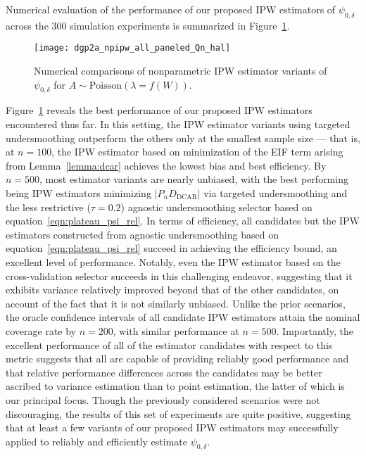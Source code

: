 Numerical evaluation of the performance of our proposed IPW estimators of
$\psi_{0,\delta}$ across the $300$ simulation experiments is summarized in
Figure~\ref{fig:dgp2a_npipw}.
\begin{figure}[H]
  \centering
  \texttt{[image: dgp2a\_npipw\_all\_paneled\_Qn\_hal]}
  \caption{Numerical comparisons of nonparametric IPW estimator variants of
       $\psi_{0,\delta}$ for $A \sim \text{Poisson}(\lambda = f(W))$.}
  \label{fig:dgp2a_npipw}
\end{figure}
Figure~\ref{fig:dgp2a_npipw} reveals the best performance of our proposed IPW
estimators encountered thus far. In this setting, the IPW estimator variants
using targeted undersmoothing outperform the others only at the smallest sample
size --- that is, at $n=100$, the IPW estimator based on minimization of the
EIF term arising from Lemma~\ref{lemma:dcar} achieves the lowest bias and best
efficiency. By $n=500$, most estimator variants are nearly unbiased, with the
best performing being IPW estimators minimizing $\lvert P_n D_\text{DCAR}
\rvert$ via targeted undersmoothing and the less restrictive ($\tau = 0.2$)
agnostic undersmoothing selector based on equation~\eqref{eqn:plateau_psi_rel}.
In terms of efficiency, all candidates but the IPW estimators constructed from
agnostic undersmoothing based on equation~\eqref{eqn:plateau_psi_rel} succeed in
achieving the efficiency bound, an excellent level of performance. Notably, even
the IPW estimator based on the cross-validation selector succeeds in this
challenging endeavor, suggesting that it exhibits variance relatively improved
beyond that of the other candidates, on account of the fact that it is not
similarly unbiased. Unlike the prior scenarios, the oracle confidence intervals
of all candidate IPW estimators attain the nominal coverage rate by $n=200$,
with similar performance at $n=500$. Importantly, the excellent performance of
all of the estimator candidates with respect to this metric suggests that all
are capable of providing reliably good performance and that relative performance
differences across the candidates may be better ascribed to variance estimation
than to point estimation, the latter of which is our principal focus. Though the
previously considered scenarios were not discouraging, the results of this set
of experiments are quite positive, suggesting that at least a few variants of
our proposed IPW estimators may successfully applied to reliably and efficiently
estimate $\psi_{0,\delta}$.

